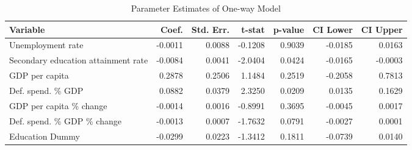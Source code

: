 \clearpage

\begin{table}[htbp]
\caption{Parameter Estimates of One-way Model}
\centering
\begin{threeparttable}
\begin{tabularx}{\textwidth}{@{}Xrrrrrr@{}}
\toprule
\textbf{Variable} & \textbf{Coef.} & \textbf{Std. Err.} & \textbf{t-stat} & \textbf{p-value} & \textbf{CI Lower} & \textbf{CI Upper} \\
\midrule
Unemployment rate & -0.0011 & 0.0088 & -0.1208 & 0.9039 & -0.0185 & 0.0163 \\
Secondary education attainment rate & -0.0084 & 0.0041 & -2.0404 & 0.0424 & -0.0165 & -0.0003 \\
GDP per capita & 0.2878 & 0.2506 & 1.1484 & 0.2519 & -0.2058 & 0.7813 \\
Def. spend. \% GDP & 0.0882 & 0.0379 & 2.3250 & 0.0209 & 0.0135 & 0.1629 \\
GDP per capita \% change & -0.0014 & 0.0016 & -0.8991 & 0.3695 & -0.0045 & 0.0017 \\
Def. spend. \% GDP \% change & -0.0013 & 0.0007 & -1.7632 & 0.0791 & -0.0027 & 0.0001 \\
Education Dummy & -0.0299 & 0.0223 & -1.3412 & 0.1811 & -0.0739 & 0.0140 \\
\bottomrule
\end{tabularx}
\end{threeparttable}
\label{tab:oneway_model}
\end{table}


